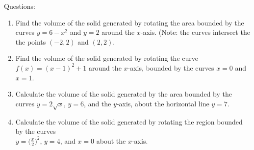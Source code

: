 \documentclass[16pt]{article}
\theoremstyle{remark}
\begin{document}
Questions:
\begin{enumerate}
\item Find the volume of the solid generated by rotating the area bounded by the curves $y=6-x^2$ and $y=2$ around the $x$-axis. (Note: the curves intersect the the points $(-2,2)$ and $(2,2)$.
\newpage
\item Find the volume of the solid generated by rotating the curve $f(x) = (x-1)^2+1$ around the $x$-axis, bounded by the curves $x=0$ and $x=1$.
\newpage
\item Calculate the volume of the solid generated by the area bounded by the curves $y=2\sqrt{x}$, $y=6$, and the $y$-axis, about the horizontal line $y=7$.
\newpage\item Calculate the volume of the solid generated by rotating the region bounded by the curves\\ $\displaystyle{y=\bigg(\frac{x}{2}\bigg)^2}$, $y=4$, and $x=0$ about the $x$-axis.
\end{enumerate}
\end{document}
